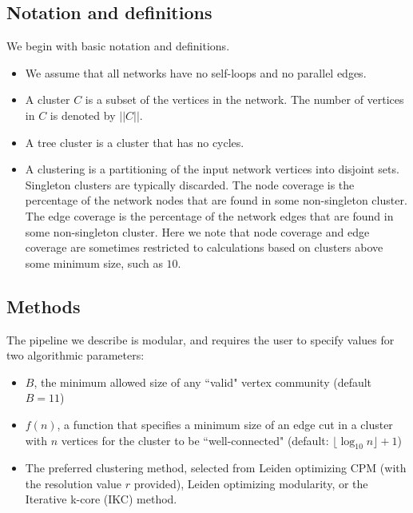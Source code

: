 \documentclass[11pt]{article}   	%
\begin{document}
\subsection{Notation and definitions}
We begin with basic notation and definitions.
\begin{itemize}
\item We assume that all networks have no self-loops and no parallel edges.
\item A cluster $C$ is a subset of the vertices in the network. The number of vertices in $C$ is denoted by $||C||$.
\item A tree cluster is a cluster that has no cycles.
\item A clustering is a partitioning of the input network vertices into disjoint sets.  Singleton clusters are typically
discarded.  The node coverage is the percentage of the network nodes that are found in some non-singleton cluster.
The edge coverage is the percentage of the network edges that are found in some non-singleton cluster.
Here we note that node coverage and edge coverage are sometimes restricted to calculations based on clusters above some minimum size, such as $10$.
\end{itemize}

\subsection{Methods}
The pipeline we describe is modular, and requires the user to specify values for two algorithmic parameters:
\begin{itemize}
\item $B$, the minimum allowed size of any ``valid" vertex community (default $B=11$)
\item $f(n)$, a function that specifies a minimum size of an edge cut in a cluster with $n$ vertices  for the cluster to be ``well-connected" (default: $ \lfloor \log_{10} n \rfloor +1$)
\item The preferred clustering method, selected from Leiden optimizing CPM (with the resolution value $r$ provided), Leiden optimizing modularity, or the Iterative k-core (IKC) method.
\end{itemize}
\end{document}

